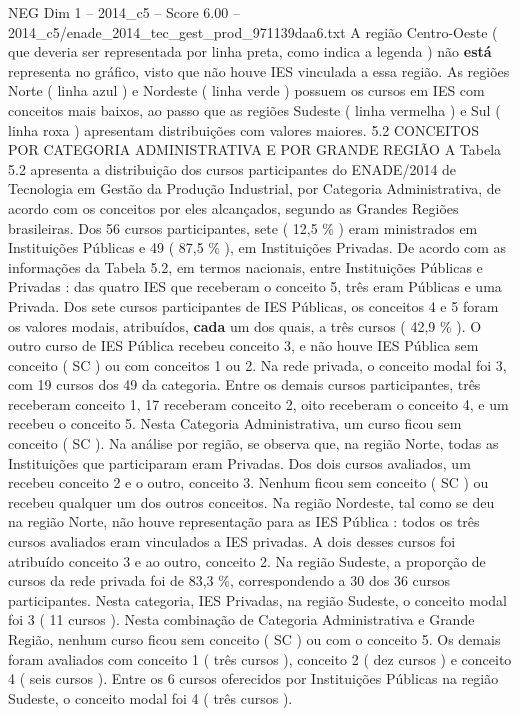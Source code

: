 \begin{textsample}{NEG Dim 1 – 2014\_c5 – Score 6.00 – 2014\_c5/enade\_2014\_tec\_gest\_prod\_971139daa6.txt}
A região Centro-Oeste ( que deveria ser representada por linha preta, como indica a legenda ) não \textbf{está} representa no gráfico, visto que não houve IES vinculada a essa região.
As regiões Norte ( linha azul ) e Nordeste ( linha verde ) possuem os cursos em IES com conceitos mais baixos, ao passo que as regiões Sudeste ( linha vermelha ) e Sul ( linha roxa ) apresentam distribuições com valores maiores. 5.2 CONCEITOS POR CATEGORIA ADMINISTRATIVA E POR GRANDE REGIÃO A Tabela 5.2 apresenta a distribuição dos cursos participantes do ENADE/2014 de Tecnologia em Gestão da Produção Industrial, por Categoria Administrativa, de acordo com os conceitos por eles alcançados, segundo as Grandes Regiões brasileiras.
Dos 56 cursos participantes, sete ( 12,5 \% ) eram ministrados em Instituições Públicas e 49 ( 87,5 \% ), em Instituições Privadas.
De acordo com as informações da Tabela 5.2, em termos nacionais, entre Instituições Públicas e Privadas : das quatro IES que receberam o conceito 5, três eram Públicas e uma Privada.
Dos sete cursos participantes de IES Públicas, os conceitos 4 e 5 foram os valores modais, atribuídos, \textbf{cada} um dos quais, a três cursos ( 42,9 \% ).
O outro curso de IES Pública recebeu conceito 3, e não houve IES Pública sem conceito ( SC ) ou com conceitos 1 ou 2.
Na rede privada, o conceito modal foi 3, com 19 cursos dos 49 da categoria.
Entre os demais cursos participantes, três receberam conceito 1, 17 receberam conceito 2, oito receberam o conceito 4, e um recebeu o conceito 5.
Nesta Categoria Administrativa, um curso ficou sem conceito ( SC ).
Na análise por região, se observa que, na região Norte, todas as Instituições que participaram eram Privadas.
Dos dois cursos avaliados, um recebeu conceito 2 e o outro, conceito 3.
Nenhum ficou sem conceito ( SC ) ou recebeu qualquer um dos outros conceitos.
Na região Nordeste, tal como se deu na região Norte, não houve representação para as IES Pública : todos os três cursos avaliados eram vinculados a IES privadas.
A dois desses cursos foi atribuído conceito 3 e ao outro, conceito 2.
Na região Sudeste, a proporção de cursos da rede privada foi de 83,3 \%, correspondendo a 30 dos 36 cursos participantes.
Nesta categoria, IES Privadas, na região Sudeste, o conceito modal foi 3 ( 11 cursos ).
Nesta combinação de Categoria Administrativa e Grande Região, nenhum curso ficou sem conceito ( SC ) ou com o conceito 5.
Os demais foram avaliados com conceito 1 ( três cursos ), conceito 2 ( dez cursos ) e conceito 4 ( seis cursos ).
Entre os 6 cursos oferecidos por Instituições Públicas na região Sudeste, o conceito modal foi 4 ( três cursos ).

\end{textsample}

